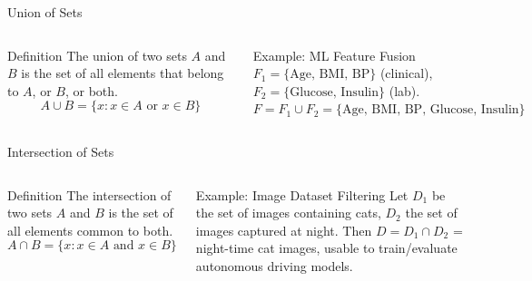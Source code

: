 \documentclass[aspectratio=169]{beamer}
\newcommand{\circA}{(0,0) circle (1.3)}
\newcommand{\circB}{(1.3,0) circle (1.3)}
\begin{document}
\begin{frame}{Union of Sets}
\begin{columns}
\begin{block}{Definition}
The union of two sets $A$ and $B$ is the set of all elements that belong to $A$, or $B$, or both.
$$A\cup B=\{x : x\in A \text{ or } x\in B\}$$
\end{block}
\begin{exampleblock}{Example: ML Feature Fusion}
$F_1=\{\text{Age, BMI, BP}\}$ (clinical), $F_2=\{\text{Glucose, Insulin}\}$ (lab). \\
$F=F_1\cup F_2=\{\text{Age, BMI, BP, Glucose, Insulin}\}$
\end{exampleblock}
\centering
{}
\end{columns}
\end{frame}

\begin{frame}{Intersection of Sets}
\begin{columns}
\begin{block}{Definition}
The intersection of two sets $A$ and $B$ is the set of all elements common to both.
$$A\cap B=\{x : x\in A \text{ and } x\in B\}$$
\end{block}
\begin{exampleblock}{Example: Image Dataset Filtering}
Let $D_1$ be the set of images containing cats, $D_2$ the set of images captured at night. Then $D=D_1\cap D_2$ = night-time cat images, usable to train/evaluate autonomous driving models.
\end{exampleblock}
\centering
{}
\end{columns}
\end{frame}
\end{document}
